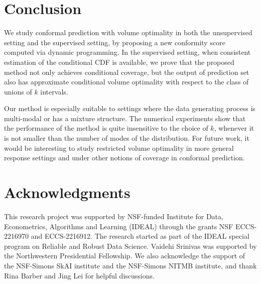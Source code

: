 \section{Conclusion}

We study conformal prediction with volume optimality 
in both the unsupervised setting and the supervised setting, 
by proposing a new conformity score computed via dynamic programming. In the supervised setting, when consistent estimation of the conditional CDF is available, we prove that the proposed method not only achieves conditional coverage, but the output of prediction set also has approximate conditional volume optimality with respect to the class of unions of $k$ intervals.

Our method is especially suitable to settings where the data generating process is multi-modal or  has a mixture structure. The numerical experiments show that the performance of the method is quite insensitive to the choice of $k$, whenever it is not smaller than the number of modes of the distribution. For future work, it would be interesting to study restricted volume optimality in more general response settings and under other notions of coverage in conformal prediction. 


\section*{Acknowledgments}
This research project was supported by NSF-funded Institute for Data, Econometrics, Algorithms and Learning (IDEAL) through the grants NSF ECCS-2216970 and ECCS-2216912. The research started as part of the IDEAL special program on Reliable and Robust Data Science. Vaidehi Srinivas was supported by the Northwestern Presidential Fellowship.  We also acknowledge the support of the NSF-Simons SkAI institute and the NSF-Simons NITMB institute, and thank Rina Barber and Jing Lei for helpful discussions.